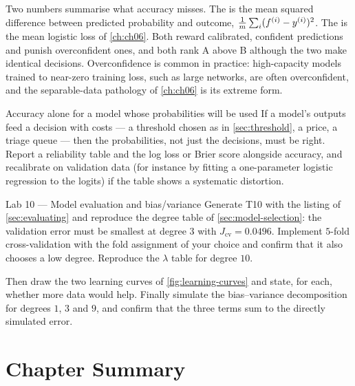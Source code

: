 Two numbers summarise what accuracy misses. The  is the mean
squared difference between predicted probability and outcome,
$\frac1m\sum_i(f^{(i)} - y^{(i)})^2$. The  is the mean logistic
loss of \cref{ch:ch06}. Both reward calibrated, confident predictions and punish
overconfident ones, and both rank A above B although the two make identical
decisions. Overconfidence is common in practice: high-capacity models trained to
near-zero training loss, such as large networks, are often overconfident, and the
separable-data pathology of \cref{ch:ch06} is its extreme form.

\begin{pitfall}{Accuracy alone for a model whose probabilities will be used}
If a model's outputs feed a decision with costs --- a threshold chosen as in
\cref{sec:threshold}, a price, a triage queue --- then the probabilities, not
just the decisions, must be right. Report a reliability table and the log loss
or Brier score alongside accuracy, and recalibrate on validation data (for
instance by fitting a one-parameter logistic regression to the logits) if the
table shows a systematic distortion.
\end{pitfall}

\begin{labbox}{Lab 10 --- Model evaluation and bias/variance}
Generate T10 with the listing of \cref{sec:evaluating} and reproduce the degree
table of \cref{sec:model-selection}: the validation error must be smallest at
degree $3$ with $J_{\text{cv}} = 0.0496$. Implement $5$-fold cross-validation
with the fold assignment of your choice and confirm that it also chooses a low
degree. Reproduce the $\lambda$ table for degree $10$.

Then draw the two learning curves of \cref{fig:learning-curves} and state, for
each, whether more data would help. Finally simulate the bias--variance
decomposition for degrees $1$, $3$ and $9$, and confirm that the three terms sum
to the directly simulated error.
\end{labbox}

\section*{Chapter Summary}

